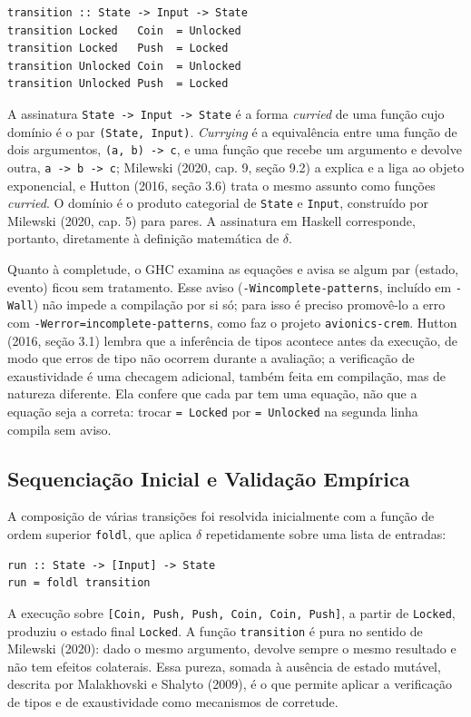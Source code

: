 \documentclass[12pt,a4paper]{article}
\begin{document}
\begin{verbatim}
transition :: State -> Input -> State
transition Locked   Coin  = Unlocked
transition Locked   Push  = Locked
transition Unlocked Coin  = Unlocked
transition Unlocked Push  = Locked
\end{verbatim}

A assinatura \texttt{State -> Input -> State} é a forma \textit{curried} de uma função cujo domínio é o par \texttt{(State, Input)}. \textit{Currying} é a equivalência entre uma função de dois argumentos, \texttt{(a, b) -> c}, e uma função que recebe um argumento e devolve outra, \texttt{a -> b -> c}; Milewski (2020, cap. 9, seção 9.2) a explica e a liga ao objeto exponencial, e Hutton (2016, seção 3.6) trata o mesmo assunto como funções \textit{curried}. O domínio é o produto categorial de \texttt{State} e \texttt{Input}, construído por Milewski (2020, cap. 5) para pares. A assinatura em Haskell corresponde, portanto, diretamente à definição matemática de $\delta$.

Quanto à completude, o GHC examina as equações e avisa se algum par (estado, evento) ficou sem tratamento. Esse aviso (\texttt{-Wincomplete-patterns}, incluído em \texttt{-Wall}) não impede a compilação por si só; para isso é preciso promovê-lo a erro com \texttt{-Werror=incomplete-patterns}, como faz o projeto \texttt{avionics-crem}. Hutton (2016, seção 3.1) lembra que a inferência de tipos acontece antes da execução, de modo que erros de tipo não ocorrem durante a avaliação; a verificação de exaustividade é uma checagem adicional, também feita em compilação, mas de natureza diferente. Ela confere que cada par tem uma equação, não que a equação seja a correta: trocar \texttt{= Locked} por \texttt{= Unlocked} na segunda linha compila sem aviso.

\subsection{Sequenciação Inicial e Validação Empírica}

A composição de várias transições foi resolvida inicialmente com a função de ordem superior \texttt{foldl}, que aplica $\delta$ repetidamente sobre uma lista de entradas:

\begin{verbatim}
run :: State -> [Input] -> State
run = foldl transition
\end{verbatim}

A execução sobre \texttt{[Coin, Push, Push, Coin, Coin, Push]}, a partir de \texttt{Locked}, produziu o estado final \texttt{Locked}. A função \texttt{transition} é pura no sentido de Milewski (2020): dado o mesmo argumento, devolve sempre o mesmo resultado e não tem efeitos colaterais. Essa pureza, somada à ausência de estado mutável, descrita por Malakhovski e Shalyto (2009), é o que permite aplicar a verificação de tipos e de exaustividade como mecanismos de corretude.
\end{document}
